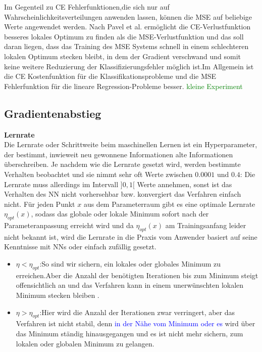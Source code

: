 \documentclass[12pt,a4paper]{scrartcl}
\numberwithin{equation}{section}
\begin{document}
Im Gegenteil zu CE Fehlerfunktionen,die sich nur auf Wahrscheinlichkeitsverteilungen anwenden lassen, können die MSE auf beliebige Werte angewendet werden. Nach Pavel et al.\cite{7} ermöglicht die CE-Verlustfunktion besseres lokales Optimum zu finden als die MSE-Verlustfunktion und das soll daran liegen, dass das Training des MSE Systems schnell in einem schlechteren lokalen Optimum stecken bleibt, in dem der Gradient verschwand und somit keine weitere Reduzierung der Klassifizierungsfehler möglich ist.Im Allgemein ist die CE Kostenfunktion für die Klassifikationsprobleme und die MSE Fehlerfunktion für die lineare Regression-Probleme besser.
\textcolor{green}{kleine Experiment}





\subsection{Gradientenabstieg}
\textbf{Lernrate}\\
Die Lernrate oder Schrittweite beim maschinellen Lernen ist ein Hyperparameter, der bestimmt, inwieweit neu gewonnene Informationen alte Informationen überschreiben\cite{LearningRate}.
Je nachdem wie die Lernrate gesetzt wird, werden bestimmte Verhalten beobachtet und sie nimmt sehr oft Werte zwischen $ 0.0001 $ und $ 0.4 $:
Die Lernrate muss allerdings im Intervall  $]0,1[$ Werte annehmen, sonst ist das Verhalten des \ac{NN} nicht vorhersehbar bzw. konvergiert das Verfahren einfach nicht.
Für jeden Punkt $ x $ aus dem Parameterraum gibt es eine optimale Lernrate $ \eta_{opt}(x) $, sodass das globale oder lokale Minimum sofort nach der Parameteranpassung erreicht wird und da $ \eta_{opt}(x) $ am Trainingsanfang leider nicht bekannt ist, wird die Lernrate in die Praxis vom Anwender basiert auf seine Kenntnisse mit \acsp{NN} oder einfach zufällig gesetzt.
\begin{itemize}
	\item $ \eta < \eta_{opt} $:So sind wir sichern, ein lokales oder globales Minimum zu erreichen.Aber die Anzahl der benötigten Iterationen bis zum Minimum steigt offensichtlich an und das Verfahren kann in einem unerwünschten lokalen Minimum stecken bleiben .
	\item $ \eta > \eta_{opt} $:Hier wird die Anzahl der Iterationen zwar verringert, aber das Verfahren ist nicht stabil, denn \textcolor{blue}{in der Nähe vom Minimum oder es} wird über das Minimum ständig hinausgegangen und es ist nicht mehr sichern, zum lokalen oder globalen Minimum zu gelangen.
\end{itemize}
\end{document}
